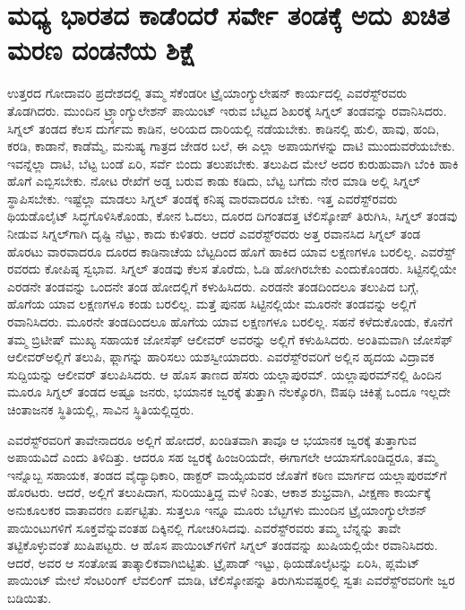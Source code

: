 
\chapter{ಮಧ್ಯ ಭಾರತದ ಕಾಡೆಂದರೆ ಸರ್ವೇ ತಂಡಕ್ಕೆ ಅದು ಖಚಿತ ಮರಣ ದಂಡನೆಯ ಶಿಕ್ಷೆ}

ಉತ್ತರದ ಗೋದಾವರಿ ಪ್ರದೇಶದಲ್ಲಿ ತಮ್ಮ ಸೆಕೆಂಡರೀ ಟ್ರೈಯಾಂಗ್ಯುಲೇಷನ್​ ಕಾರ್ಯದಲ್ಲಿ ಎವರೆಸ್ಟ್​ರವರು ತೊಡಗಿದರು. ಮುಂದಿನ ಟ್ರ್ಯಾಂಗ್ಯುಲೇಶನ್​ ಪಾಯಿಂಟ್​ ಇರುವ ಬೆಟ್ಟದ ಶಿಖರಕ್ಕೆ ಸಿಗ್ನಲ್​ ತಂಡವನ್ನು ರವಾನಿಸಿದರು. ಸಿಗ್ನಲ್​ ತಂಡದ ಕೆಲಸ ದುರ್ಗಮ ಕಾಡಿನ, ಅರಿಯದ ದಾರಿಯಲ್ಲಿ ನಡೆಯಬೇಕು. ಕಾಡಿನಲ್ಲಿ ಹುಲಿ, ಹಾವು, ಹಂದಿ, ಕರಡಿ, ಕಾಡಾನೆ, ಕಾಡೆಮ್ಮೆ, ಮನುಷ್ಯ ಗಾತ್ರದ ಜೇಡರ ಬಲೆ, ಈ ಎಲ್ಲಾ ಅಪಾಯಗಳನ್ನು ದಾಟಿ ಮುಂದುವರೆಯಬೇಕು. ಇವನ್ನೆಲ್ಲಾ ದಾಟಿ, ಬೆಟ್ಟ ಬಂಡೆ ಏರಿ, ಸರ್ವೆ ಬಿಂದು ತಲುಪಬೇಕು. ತಲುಪಿದ ಮೇಲೆ ಅದರ ಕುರುಹುವಾಗಿ ಬೆಂಕಿ ಹಾಕಿ ಹೊಗೆ ಎಬ್ಬಿಸಬೇಕು. ನೋಟ ರೇಖೆಗೆ ಅಡ್ಡ ಬರುವ ಕಾಡು ಕಡಿದು, ಬೆಟ್ಟ ಬಗೆದು ನೇರ ಮಾಡಿ ಅಲ್ಲಿ ಸಿಗ್ನಲ್​ ಸ್ಥಾಪಿಸಬೇಕು. ಇಷ್ಟೆಲ್ಲಾ ಮಾಡಲು ಸಿಗ್ನಲ್​ ತಂಡಕ್ಕೆ ಕನಿಷ್ಠ  ವಾರವಾದರೂ ಬೇಕು. ಇತ್ತ ಎವರೆಸ್ಟ್​ರವರು ಥಿಯಡೊಲೈಟ್​ ಸಿದ್ಧಗೊಳಿಸಿಕೊಂಡು, ಕೋನ ಓದಲು, ದೂರದ ದಿಗಂತದತ್ತ ಟೆಲಿಸ್ಕೋಪ್​ ತಿರುಗಿಸಿ, ಸಿಗ್ನಲ್​ ತಂಡವು ನೀಡುವ ಸಿಗ್ನಲ್​ಗಾಗಿ ದೃಷ್ಟಿ ನೆಟ್ಟು, ಕಾದು ಕುಳಿತರು. ಆದರೆ ಎವರೆಸ್ಟ್​ರವರು ಅತ್ತ ರವಾನಸಿದ ಸಿಗ್ನಲ್​ ತಂಡ ಹೊರಟು  ವಾರವಾದರೂ ದೂರದ ಕಾಡಿನಾಚೆಯ ಬೆಟ್ಟದಿಂದ ಹೊಗೆ ಹಾಕಿದ ಯಾವ ಲಕ್ಷಣಗಳೂ ಬರಲಿಲ್ಲ. ಎವರೆಸ್ಟ್​ರವರದು ಕೋಪಿಷ್ಠ ಸ್ವಭಾವ. ಸಿಗ್ನಲ್​ ತಂಡವು ಕೆಲಸ ತೊರೆದು, ಓಡಿ ಹೋಗಿರಬೇಕು ಎಂದುಕೊಂಡರು. ಸಿಟ್ಟಿನಲ್ಲಿಯೇ ಎರಡನೇ ತಂಡವನ್ನು ಒಂದನೇ ತಂಡ ಹೋದಲ್ಲಿಗೆ ಕಳುಹಿಸಿದರು. ಎರಡನೇ ತಂಡದಿಂದಲೂ ತಲುಪಿದ ಬಗ್ಗೆ, ಹೊಗೆಯ ಯಾವ ಲಕ್ಷಣಗಳೂ ಕಂಡು ಬರಲಿಲ್ಲ. ಮತ್ತೆ ಪುನಹ ಸಿಟ್ಟಿನಲ್ಲಿಯೇ ಮೂರನೇ ತಂಡವನ್ನು ಅಲ್ಲಿಗೆ ರವಾನಿಸಿದರು. ಮೂರನೇ ತಂಡದಿಂದಲೂ ಹೊಗೆಯ ಯಾವ ಲಕ್ಷಣಗಳೂ ಬರಲಿಲ್ಲ. ಸಹನೆ ಕಳೆದುಕೊಂಡು, ಕೊನೆಗೆ ತಮ್ಮ ಬ್ರಿಟೀಷ್​ ಮುಖ್ಯ ಸಹಾಯಕ ಜೋಸೆಫ್​ ಆಲೀವರ್​ ಅವರನ್ನು ಅಲ್ಲಿಗೆ ಕಳುಹಿಸಿದರು. ಅಂತಿಮವಾಗಿ ಜೋಸೆಫ್​ ಆಲೀವರ್​\break ಅಲ್ಲಿಗೆ ತಲುಪಿ, ಫ್ಲಾಗನ್ನು ಹಾರಿಸಲು ಯಶಸ್ವೀಯಾದರು. ಎವರೆಸ್ಟ್​ರವರಿಗೆ ಅಲ್ಲಿನ ಹೃದಯ ವಿದ್ರಾವಕ ಸುದ್ದಿಯನ್ನು ಆಲೀವರ್​ ತಲುಪಿಸಿದರು. ಆ ಹೊಸ ತಾಣದ ಹೆಸರು ಯಲ್ಲಾಪುರಮ್. ಯಲ್ಲಾಪುರಮ್‌ನಲ್ಲಿ ಹಿಂದಿನ ಮೂರೂ ಸಿಗ್ನಲ್​ ತಂಡದ ಅಷ್ಟೂ ಜನರು, ಭಯಾನಕ ಜ್ವರಕ್ಕೆ ತುತ್ತಾಗಿ ನೆಲಕ್ಕೊರಗಿ, ಔಷಧಿ ಚಿಕಿತ್ಸೆ ಒಂದೂ ಇಲ್ಲದೇ ಚಿಂತಾಜನಕ ಸ್ಥಿತಿಯಲ್ಲಿ, ಸಾವಿನ ಸ್ಥಿತಿಯಲ್ಲಿದ್ದರು.

ಎವರೆಸ್ಟ್​ರವರಿಗೆ ತಾವೇನಾದರೂ ಅಲ್ಲಿಗೆ ಹೋದರೆ, ಖಂಡಿತವಾಗಿ ತಾವೂ ಆ ಭಯಾನಕ ಜ್ವರಕ್ಕೆ ತುತ್ತಾಗುವ ಅಪಾಯವಿದೆ ಎಂದು ತಿಳಿದಿತ್ತು. ಆದರೂ ಸಹ ಜ್ವರಕ್ಕೆ ಹಿಂಜರಿಯದೇ, ಈಗಾಗಲೇ ಆಯಾಸಗೊಂಡಿದ್ದರೂ, ತಮ್ಮ ಇನ್ನೊಬ್ಬ ಸಹಾಯಕ, ತಂಡದ ವೈದ್ಯಾಧಿಕಾರಿ, ಡಾಕ್ಟರ್​ ವಾಯ್ಸೆಯವರ ಜೊತೆಗೆ ಕಠಿಣ ಮಾರ್ಗದ ಯಲ್ಲಾಪುರಮ್‌ಗೆ ಹೊರಟರು. ಆದರೆ, ಅಲ್ಲಿಗೆ ತಲುಪಿದಾಗ, ಸುರಿಯುತ್ತಿದ್ದ ಮಳೆ ನಿಂತು, ಆಕಾಶ ಶುಭ್ರವಾಗಿ, ವೀಕ್ಷಣಾ ಕಾರ್ಯಕ್ಕೆ ಅನುಕೂಲಕರ ವಾತಾವರಣ ಏರ್ಪಟ್ಟಿತು. ಸುತ್ತಲೂ ಇನ್ನೂ ಮೂರು ಬೆಟ್ಟಗಳು ಮುಂದಿನ ಟ್ರೈಯಾಂಗ್ಯುಲೇಶನ್​ ಪಾಯಿಂಟುಗಳಿಗೆ ಸೂಕ್ತವೆನ್ನುವಂತಹ ದಿಕ್ಕಿನಲ್ಲಿ ಗೋಚರಿಸಿದವು. ಎವರೆಸ್ಟ್​ರವರು ತಮ್ಮ ಬೆನ್ನನ್ನು ತಾವೇ ತಟ್ಟಿಕೊಳ್ಳುವಂತೆ ಖುಷಿಪಟ್ಟರು. ಆ ಹೊಸ ಪಾಯಿಂಟ್​ಗಳಿಗೆ ಸಿಗ್ನಲ್​ ತಂಡವನ್ನು ಖುಷಿಯಲ್ಲಿಯೇ ರವಾನಿಸಿದರು. ಆದರೆ, ಅವರ ಆ ಸಂತೋಷ ತಾತ್ಕಾಲಿಕವಾಗಿಬಿಟ್ಟಿತು. ಟ್ರೈಪಾಡ್​ ಇಟ್ಟು, ಥಿಯಡೊಲೈಟನ್ನು ಏರಿಸಿ, ಪ್ಲಮೆಟ್​ ಪಾಯಿಂಟ್​ ಮೇಲೆ ಸೆಂಟರಿಂಗ್​ ಲೆವಲಿಂಗ್​ ಮಾಡಿ, ಟೆಲಿಸ್ಕೋಪನ್ನು ತಿರುಗಿಸುವಷ್ಟರಲ್ಲಿ ಸ್ವತಃ ಎವರೆಸ್ಟ್​ರವರಿಗೇ ಜ್ವರ ಬಡಿಯಿತು.

